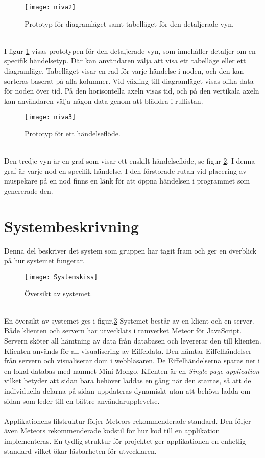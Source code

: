 \begin{figure}[H]
    \centering
    \texttt{[image: niva2]}
    \caption{Prototyp för diagramläget samt tabelläget för den detaljerade vyn.}
    \label{fig:prototype-details}
\end{figure}
\ \\
I figur \ref{fig:prototype-details} visas prototypen för den detaljerade vyn, som innehåller detaljer om en specifik händelsetyp. 
Där kan användaren välja att visa ett tabelläge eller ett diagramläge. Tabelläget visar en rad för varje händelse i noden, och den kan sorteras baserat på alla kolumner. 
Vid växling till diagramläget visas olika data för noden över tid. 
På den horisontella axeln visas tid, och på den vertikala axeln kan användaren välja någon data genom att bläddra i rullistan. 

\begin{figure}[H]
    \centering
    \texttt{[image: niva3]}
    \caption{Prototyp för ett händelseflöde.}
    \label{fig:prototype-eventchain}
\end{figure}
\ \\
Den tredje vyn är en graf som visar ett enskilt händelseflöde, se figur \ref{fig:prototype-eventchain}. 
I denna graf är varje nod en specifik händelse. 
I den förstorade rutan vid placering av muspekare på en nod finns en länk för att öppna händelsen i programmet som genererade den.

\section{Systembeskrivning}
Denna del beskriver det system som gruppen har tagit fram och ger en överblick på hur systemet fungerar.
\label{sec:results-systemoverview}
\begin{figure}[h]
    \centering
    \texttt{[image: Systemskiss]}
    \caption{Översikt av systemet.}
    \label{fig:architectural_overview}
\end{figure}
\\
En översikt av systemet ges i figur.\ref{fig:architectural_overview} Systemet består av en klient och en server. Både klienten och servern har utvecklats i ramverket Meteor för JavaScript. Servern sköter all hämtning av data från databasen och levererar den till klienten. Klienten används för all visualisering av Eiffeldata. Den hämtar Eiffelhändelser från servern och visualiserar dom i webbläsaren. De Eiffelhändelserna sparas ner i en lokal databas med namnet Mini Mongo. Klienten är en \textit{Single-page application} vilket betyder att sidan bara behöver laddas en gång när den startas, så att de individuella delarna på sidan uppdateras dynamiskt utan att behöva ladda om sidan som leder till en bättre användarupplevelse.
\\ \\
Applikationens filstruktur följer Meteors rekommenderade standard.\cite{website:meteorstructure} Den följer även Meteors rekommenderade kodstil för hur kod till en applikation implementeras.\cite{website:meteorcodestyle} En tydlig struktur för projektet ger applikationen en enhetlig standard vilket ökar läsbarheten för utvecklaren.


